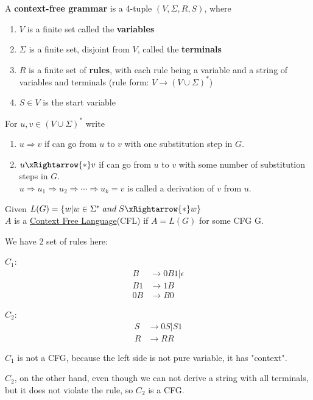 \begin{definition}[CFG]
    A \textbf{context-free grammar} is a 4-tuple \((V, \Sigma, R, S)\), where
    \begin{enumerate}
        \item \(V\) is a finite set called the \textbf{variables}
        \item \(\Sigma\) is a finite set, disjoint from \(V\), called the \textbf{terminals}
        \item \(R\) is a finite set of \textbf{rules}, with each rule being a variable and a string of variables and terminals (rule form: \(V \rightarrow (V \cup \Sigma)^*\))
        \item \(S \in V\) is the start variable       
    \end{enumerate}  

    For \(u, v \in (V \cup \Sigma)^*\) write
    \begin{enumerate}
        \item \(u \Rightarrow v\) if can go from \(u\) to \(v\) with one substitution step in \(G\).
        \item \(u \xRightarrow{*} v\) if can go from \(u\) to \(v\) with some number of substitution steps in \(G\). \\
        \(u \Rightarrow u_1 \Rightarrow u_2 \Rightarrow \cdots \Rightarrow u_k = v\) is called a derivation of \(v\) from \(u\).   
    \end{enumerate} 
\end{definition}

\begin{definition}
    Given \(L(G) = \{ w|w \in \Sigma^* \; and \; S \xRightarrow{*} w \} \)\\ 
    \(A\) is a \underline{Context Free Language}(CFL) if \(A = L(G)\) for some CFG G.  
\end{definition}

\begin{example}
    We have 2 set of rules here:

    \(C_1\):
    \begin{align*}
        B &\rightarrow 0B1 | \epsilon \\
        B1 &\rightarrow 1B \\
        0B &\rightarrow B0
    \end{align*}

    \(C_2\):
    \begin{align*}
        S &\rightarrow 0S | S1 \\
        R &\rightarrow RR
    \end{align*} 

    \(C_1\) is not a CFG, because the left side is not pure variable, it has "context". 

    \(C_2\), on the other hand, even though we can not derive a string with all terminals, but it does not violate the rule, so \(C_2\) is a CFG. 
\end{example}

